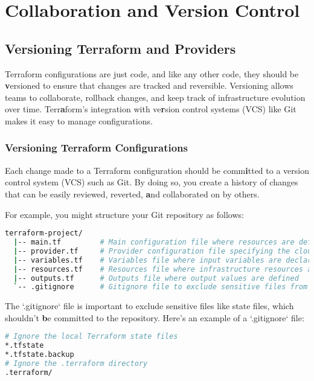 \chapter{Collaboration and Version Control}
\sloppy

\section{Versioning Terraform and Providers}

Terraform configurations are just code, and like any other code, they should be \textbf{v}ersioned to ensure that changes are tracked and reversible. Versioning allows teams to collaborate, rollback changes, and keep track of infrastructure evolution over time. Terr\textbf{a}form's integration with ve\textbf{r}sion control systems (VCS) like Git makes it easy to manage configurations.

\subsection{Versioning Terraform Configurations}

Each change made to a Terraform configuration should be comm\textbf{i}tted to a version control system (VCS) such as Git. By doing so, you create a history of changes that can be easily reviewed, reverted, \textbf{a}nd collaborated on by others.

For example, you might structure your Git repository as follows:

\begin{lstlisting}[language=bash]
  terraform-project/
  |-- main.tf         # Main configuration file where resources are defined
  |-- provider.tf     # Provider configuration file specifying the cloud provider details
  |-- variables.tf    # Variables file where input variables are declared
  |-- resources.tf    # Resources file where infrastructure resources are defined
  |-- outputs.tf      # Outputs file where output values are defined
  `-- .gitignore      # Gitignore file to exclude sensitive files from version control
\end{lstlisting}

The `.gitignore` file is important to exclude sensitive files like state files, which shouldn't \textbf{b}e committed to the repository. Here's an example of a `.gitignore` file:

\begin{lstlisting}[language=bash]
# Ignore the local Terraform state files
*.tfstate
*.tfstate.backup
# Ignore the .terraform directory
.terraform/
\end{lstlisting}

